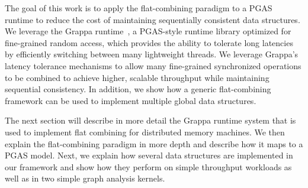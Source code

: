 The goal of this work is to apply the flat-combining paradigm to a PGAS runtime to reduce the cost of maintaining sequentially consistent data structures.
We leverage the Grappa runtime~\cite{Nelson:hotpar11-real}, a PGAS-style runtime library optimized for fine-grained random access, which provides the ability to tolerate long latencies by efficiently switching between many lightweight threads.
We leverage Grappa's latency tolerance mechanisms to allow many fine-grained synchronized operations to be combined to achieve higher, scalable throughput while maintaining sequential consistency.
In addition, we show how a generic flat-combining framework can be used to implement multiple global data structures.

The next section will describe in more detail the Grappa runtime system that is used to implement flat combining for distributed memory machines. We then explain the flat-combining paradigm in more depth and describe how it maps to a PGAS model. Next, we explain how several data structures are implemented in our framework and show how they perform on simple throughput workloads as well as in two simple graph analysis kernels.
